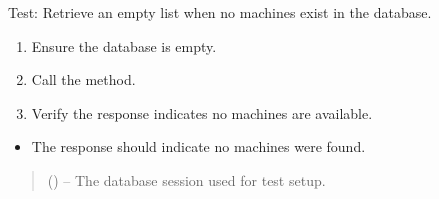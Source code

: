 \documentclass[letterpaper,10pt,english]{sphinxmanual}
\begin{document}

\begin{fulllineitems}
\label{\detokenize{test:test.test_machine.test_list_no_machines}}
\pysigstartsignatures
\pysiglinewithargsret
{}
{}
{}
\pysigstopsignatures
\sphinxAtStartPar
Test: Retrieve an empty list when no machines exist in the database.
\begin{description}
\begin{enumerate}
%
\item {} 
\sphinxAtStartPar
Ensure the database is empty.

\item {} 
\sphinxAtStartPar
Call the  method.

\item {} 
\sphinxAtStartPar
Verify the response indicates no machines are available.

\end{enumerate}

\begin{itemize}
\item {} 
\sphinxAtStartPar
The response should indicate no machines were found.

\end{itemize}

\end{description}
\begin{quote}\begin{description}
\sphinxAtStartPar
{} () – The database session used for test setup.

\end{description}\end{quote}

\end{fulllineitems}

\end{document}
